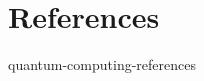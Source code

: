 \documentclass[preview]{standalone}
\begin{document}
\genpage

\nocite{*} %

\section{References}

\begin{snippet}{quantum-computing-references}
    \printbibliography[heading=none]
\end{snippet}
\end{document}

